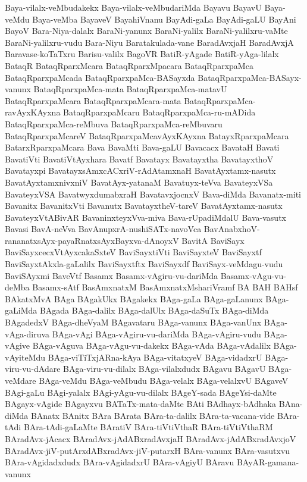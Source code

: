 {Baya-vilalx-veMbudakekx
Baya-vilalx-veMbudariMda
Bayavu
BayavU
Baya-veMdu
Baya-veMba
BayaveV
BayahiVnanu
BayAdi-gaLa
BayAdi-gaLU
BayAni
BayoV
Bara-Niya-dalalx
BaraNi-yanunx
BaraNi-yalilx
BaraNi-yalilxru-vaMte
BaraNi-yalilxru-vudu
Bara-Niyu
Baratakulada-vane
BaradAvxjaH
BaradAvxjA
Baravase-koTaTxru
Barisu-valilx
BagoVR
BatiR-yAgade
BatiR-yAga-lilalx
BataqR
BataqRparxMcara
BataqRparxMpacara
BataqRparxpaMca
BataqRparxpaMcada
BataqRparxpaMca-BASayxda
BataqRparxpaMca-BASayx-vanunx
BataqRparxpaMca-mata
BataqRparxpaMca-matavU
BataqRparxpaMcara
BataqRparxpaMcara-mata
BataqRparxpaMca-ravAyxKAyxna
BataqRparxpaMcaru
BataqRparxpaMca-ru-mADida
BataqRparxpaMca-reMbuva
BataqRparxpaMca-reMbuvaru
BataqRparxpaMcareV
BataqRparxpaMcavAyxKAyxna
BatayxRparxpaMcara
BatarxRparxpaMcara
Bava
BavaMti
Bava-gaLU
Bavacacx
BavataH
Bavati
BavatiVti
BavatiVtAyxhara
Bavatf
Bavatayx
Bavatayxtha
BavatayxthoV
Bavatayxpi
BavatayxsAmxcACxriV-rAdAtamxnaH
BavatAyxtamx-nasutx
BavatAyxtamxnivxniV
BavatAyx-yatanaM
Bavatuyx-teVva
BavateyxVSa
BavateyxVSA
BavatwyxdumabxraH
BavatavxjocnxV
Bava-diMda
Bavanatx-miti
Bavanitx
BavanitxVti
Bavanutx
BavatayxtheV-tareV
BavatAyxtamx-nasutx
BavateyxVtABivAR
BavaninxteyxVva-miva
Bava-rUpadiMdalU
Bava-vasutx
Bavasi
BavA-neVva
BavAnupxrA-nushiSATx-navoVca
BavAnabxhoV-rananatxsAyx-payaRnatxsAyxBayxva-dAnoyxV
BavitA
BaviSayx
BaviSayxcecxVtAyxcakaSxteV
BaviSayxtiVti
BaviSayxteV
BaviSayxtf
BaviSayxtAkxla-gaLalilx
BaviSayxtftx
BaviSayxdf
BaviSayx-veMdagu-vudu
BaviSAyxmi
BaveVtf
Basamx
Basamx-vAgiru-vu-dariMda
Basamx-vAgu-vu-deMba
Basamx-sAtf
BasAmxnatxM
BasAmxnatxMshariVramf
BA
BAH
BAHsf
BAkatxMvA
BAga
BAgakUkx
BAgakekx
BAga-gaLa
BAga-gaLanunx
BAga-gaLiMda
BAgada
BAga-dalilx
BAga-dalUlx
BAga-daSuTx
BAga-diMda
BAgadedxV
BAga-dheVyaM
BAgavataru
BAga-vanunx
BAga-vanUnx
BAga-vAga-diruva
BAga-vAgi
BAga-vAgiru-vu-dariMda
BAga-vAgiru-vudu
BAga-vAgive
BAga-vAguva
BAga-vAgu-vu-dakekx
BAga-vAda
BAga-vAdalilx
BAga-vAyiteMdu
BAga-viTiTxjARna-kAya
BAga-vitatxyeV
BAga-vidadxrU
BAga-viru-vu-dAdare
BAga-viru-vu-dilalx
BAga-vilalxdudx
BAgavu
BAgavU
BAga-veMdare
BAga-veMdu
BAga-veMbudu
BAga-velalx
BAga-velalxvU
BAgaveV
BAgi-gaLu
BAgi-yalalx
BAgi-yAgu-vu-dilalx
BAgeY-sada
BAgeYsi-daMte
BAgayx-vAgide
BAgayxvu
BATaTx-mata-daMte
BAti
BAdhayx-bAdhaka
BAna-diMda
BAnatx
BAnitx
BAra
BArata
BAra-ta-dalilx
BAra-ta-vacana-vide
BAra-tAdi
BAra-tAdi-gaLaMte
BAratiV
BAra-tiVtiVthaR
BAra-tiVtiVthaRM
BAradAvx-jAcacx
BAradAvx-jAdABxradAvxjaH
BAradAvx-jAdABxradAvxjoV
BAradAvx-jiV-putArxdABxradAvx-jiV-putarxH
BAra-vanunx
BAra-vasutxvu
BAra-vAgidadxdudx
BAra-vAgidadxrU
BAra-vAgiyU
BAravu
BAyAR-gamana-vanunx
}
